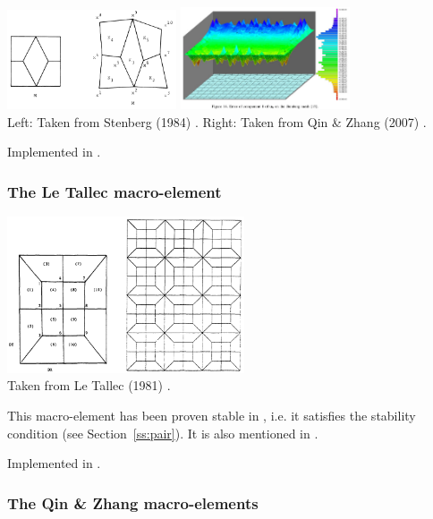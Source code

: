 \begin{center}
\includegraphics[width=5cm]{images/meshtopos/sten84}
\includegraphics[width=5cm]{images/meshtopos/qizh07}\\
{\captionfont Left: Taken from Stenberg (1984) \cite{sten84}. 
Right: Taken from Qin \& Zhang (2007) \cite{qizh07}.}
\end{center}

Implemented in .

\subsubsection{The Le Tallec macro-element} 

\begin{center}
\includegraphics[width=7cm]{images/meshtopos/leta81}\\
{\captionfont Taken from Le Tallec (1981) \cite{leta81}.}
\end{center}
This macro-element has been proven stable in \cite{leta81,leru86}, i.e. it satisfies 
the stability condition (see Section~\ref{ss:pair}).
It is also mentioned in \cite{qizh07}.

Implemented in .

\subsubsection{The Qin \& Zhang macro-elements}

